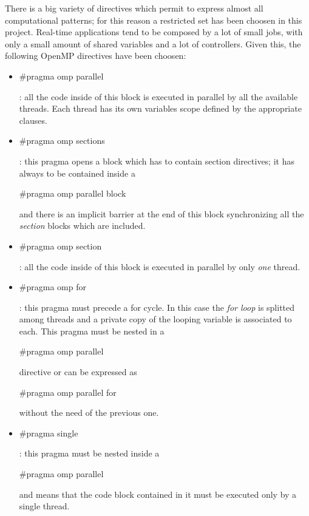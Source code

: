 \documentclass[a4paper,12pt,oneside]{book}
\begin{document}
There is a big variety of directives which permit to express almost all computational patterns; for this reason a restricted set has been choosen in this project. Real-time applications tend to be composed by a lot of small jobs, with only a small amount of shared variables and a lot of controllers. Given this, the following OpenMP directives have been choosen:
\begin{itemize}
\item{\begin{bf}{$\#$pragma omp parallel}\end{bf} : all the code inside of this block is executed in parallel by all the available threads. Each thread has its own variables scope defined by the appropriate clauses. }
\item{\begin{bf}{$\#$pragma omp sections}\end{bf} : this pragma opens a block which has to contain section directives; it has always to be contained inside a \begin{bf}$\#$pragma omp parallel block\end{bf} and there is an implicit barrier at the end of this block synchronizing all the \emph{section} blocks which are included. }
\item{\begin{bf}{$\#$pragma omp section}\end{bf} : all the code inside of this block is executed in parallel by only \emph{one} thread. }
\item{\begin{bf}{$\#$pragma omp for}\end{bf} : this pragma must precede a for cycle. In this case the \emph{for loop} is splitted among  threads and a private copy of the looping variable is associated to each. This pragma must be nested in a \begin{bf}$\#$pragma omp parallel\end{bf} directive or can be expressed as \begin{bf}{$\#$pragma omp parallel for}\end{bf} without the need of the previous one.  }
\item{\begin{bf}{$\#$pragma single}\end{bf} : this pragma must be nested inside a \begin{bf}{$\#$pragma omp parallel }\end{bf} and means that the code block contained in it must be executed only by a single thread.}

\end{itemize}
\end{document}
